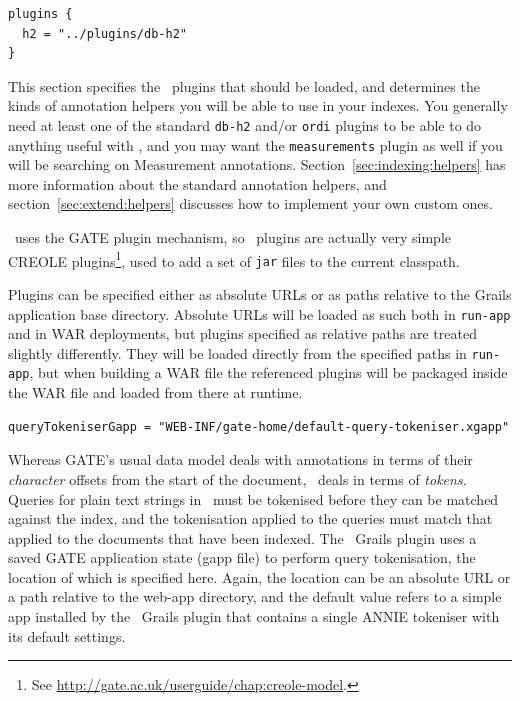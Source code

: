 \begin{lstlisting}
plugins {
  h2 = "../plugins/db-h2"
}
\end{lstlisting}

This section specifies the \Mimir\ plugins that should be loaded, and
determines the kinds of annotation helpers you will be able to use in your
indexes.  You generally need at least one of the standard {\tt db-h2} and/or
{\tt ordi} plugins to be able to do anything useful with \Mimir, and you may
want the {\tt measurements} plugin as well if you will be searching on
Measurement annotations.  Section~\ref{sec:indexing:helpers} has more
information about the standard annotation helpers, and
section~\ref{sec:extend:helpers} discusses how to implement your
own custom ones.

\Mimir\ uses the GATE plugin mechanism, so \Mimir\ plugins are actually
very simple CREOLE plugins\footnote{See
\url{http://gate.ac.uk/userguide/chap:creole-model}.}, used to add a set of
{\tt jar} files to the current classpath.
 
Plugins can be specified either as absolute URLs or as paths relative to the
Grails application base directory.  Absolute URLs will be loaded as such both
in {\tt run-app} and in WAR deployments, but plugins specified as relative
paths are treated slightly differently.  They will be loaded directly from the
specified paths in {\tt run-app}, but when building a WAR file the referenced
plugins will be packaged inside the WAR file and loaded from there at runtime.

\begin{lstlisting}
queryTokeniserGapp = "WEB-INF/gate-home/default-query-tokeniser.xgapp"
\end{lstlisting}

Whereas GATE's usual data model deals with annotations in terms of their {\em
character} offsets from the start of the document, \Mimir\ deals in terms of
{\em tokens}.  Queries for plain text strings in \Mimir\ must be tokenised
before they can be matched against the index, and the tokenisation applied to
the queries must match that applied to the documents that have been indexed.
The \Mimir\ Grails plugin uses a saved GATE application state (gapp file) to
perform query tokenisation, the location of which is specified here.  Again,
the location can be an absolute URL or a path relative to the web-app
directory, and the default value refers to a simple app installed by the
\Mimir\ Grails plugin that contains a single ANNIE tokeniser with its default
settings.

